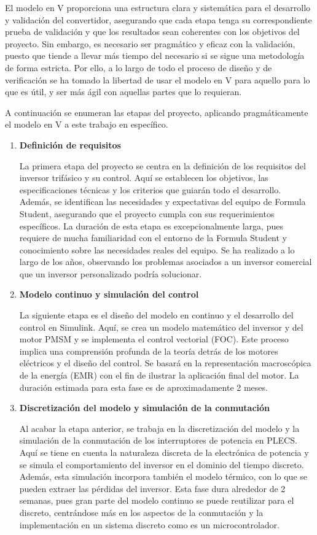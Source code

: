 El modelo en V proporciona una estructura clara y sistemática para el desarrollo y validación del convertidor, asegurando que cada etapa tenga su correspondiente prueba de validación y que los resultados sean coherentes con los objetivos del proyecto. Sin embargo, es necesario ser pragmático y eficaz con la validación, puesto que tiende a llevar más tiempo del necesario si se sigue una metodología de forma estricta. Por ello, a lo largo de todo el proceso de diseño y de verificación se ha tomado la libertad de usar el modelo en V para aquello para lo que es útil, y ser más ágil con aquellas partes que lo requieran.

A continuación se enumeran las etapas del proyecto, aplicando pragmáticamente el modelo en V a este trabajo en específico.
\begin{enumerate}
\item \textbf{Definición de requisitos}

La primera etapa del proyecto se centra en la definición de los requisitos del inversor trifásico y su control. Aquí se establecen los objetivos, las especificaciones técnicas y los criterios que guiarán todo el desarrollo. Además, se identifican las necesidades y expectativas del equipo de Formula Student, asegurando que el proyecto cumpla con sus requerimientos específicos. La duración de esta etapa es excepcionalmente larga, pues requiere de mucha familiaridad con el entorno de la Formula Student y conocimiento sobre las necesidades reales del equipo. Se ha realizado a lo largo de los años, observando los problemas asociados a un inversor comercial que un inversor personalizado podría solucionar.

\item \textbf{Modelo continuo y simulación del control}

La siguiente etapa es el diseño del modelo en continuo y el desarrollo del control en Simulink. Aquí, se crea un modelo matemático del inversor y del motor PMSM y se implementa el control vectorial (FOC). Este proceso implica una comprensión profunda de la teoría detrás de los motores eléctricos y el diseño del control. Se basará en la representación macroscópica de la energía (EMR) con el fin de ilustrar la aplicación final del motor. La duración estimada para esta fase es de aproximadamente 2 meses.

\item \textbf{Discretización del modelo y simulación de la conmutación}

Al acabar la etapa anterior, se trabaja en la discretización del modelo y la simulación de la conmutación de los interruptores de potencia en PLECS. Aquí se tiene en cuenta la naturaleza discreta de la electrónica de potencia y se simula el comportamiento del inversor en el dominio del tiempo discreto. Además, esta simulación incorpora también el modelo térmico, con lo que se pueden extraer las pérdidas del inversor. Esta fase dura alrededor de 2 semanas, pues gran parte del modelo continuo se puede reutilizar para el discreto, centrándose más en los aspectos de la conmutación y la implementación en un sistema discreto como es un microcontrolador.


\end{enumerate}
